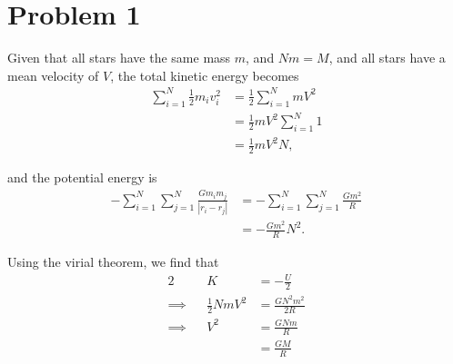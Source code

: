 \documentclass[11pt,letterpaper]{article}
\begin{document}
\section*{Problem 1}

Given that all stars have the same mass $m$, and $Nm=M$, and all stars have a mean velocity of $V$, the total kinetic energy becomes 
\begin{align*}
    \sum^N_{i=1}\frac{1}{2}m_iv_i^2 &= \frac{1}{2}\sum^N_{i=1}mV^2 \\
    &= \frac{1}{2}mV^2\sum^N_{i=1}1 \\
    &= \frac{1}{2}mV^2N,
\end{align*}

and the potential energy is
\begin{align*}
    -\sum^N_{i=1}\sum^N_{j=1}\frac{Gm_im_j}{|r_i-r_j|} &= -\sum^N_{i=1}\sum^N_{j=1}\frac{Gm^2}{R} \\
    &= -\frac{Gm^2}{R}N^2.
\end{align*}

Using the virial theorem, we find that 
\begin{alignat*}{2}
    &&K &= -\frac{U}{2} \\
    \implies&& \frac{1}{2}NmV^2 &= \frac{GN^2m^2}{2R} \\
    \implies&& V^2 &= \frac{GNm}{R} \\ 
    &&&=\frac{GM}{R}
\end{alignat*}
\end{document}
